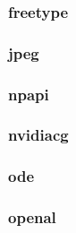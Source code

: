 \documentclass[a4paper]{article}
\begin{document}
\hypertarget{RefHeading24351167907073}{}\subsubsection{}
\clearpage\subsubsection[freetype]{freetype}
\hypertarget{RefHeading24371167907073}{}\subsubsection{}
\clearpage\subsubsection[jpeg]{jpeg}
\hypertarget{RefHeading24391167907073}{}\subsubsection{}
\clearpage\subsubsection[npapi]{npapi}
\hypertarget{RefHeading24411167907073}{}\subsubsection{}
\clearpage\subsubsection[nvidiacg]{nvidiacg}
\hypertarget{RefHeading24431167907073}{}\subsubsection{}
\clearpage\subsubsection[ode]{ode}
\hypertarget{RefHeading24451167907073}{}\subsubsection{}
\clearpage\subsubsection[openal]{openal}
\hypertarget{RefHeading24471167907073}{}\subsubsection{}
\end{document}
